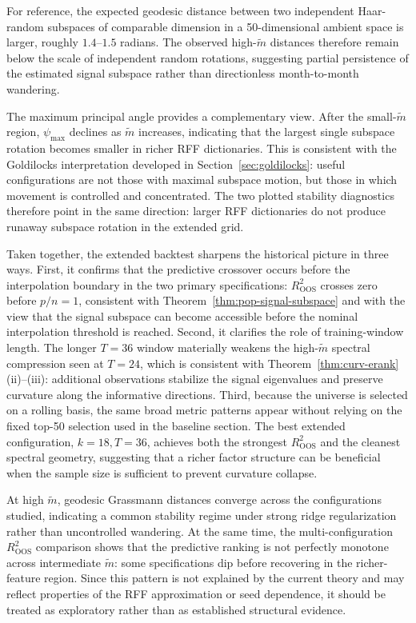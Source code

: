 \documentclass[11pt,letterpaper]{article}
\begin{document}
For reference, the expected geodesic distance between two independent
Haar-random subspaces of comparable dimension in a 50-dimensional ambient space
is larger, roughly $1.4$--$1.5$ radians. The observed high-$\tilde m$ distances
therefore remain below the scale of independent random rotations, suggesting
partial persistence of the estimated signal subspace rather than directionless
month-to-month wandering.

The maximum principal angle provides a complementary view. After the small-$\tilde m$
region, $\psi_{\max}$ declines as $\tilde m$ increases, indicating that the
largest single subspace rotation becomes smaller in richer RFF dictionaries.
This is consistent with the Goldilocks interpretation developed in
Section~\ref{sec:goldilocks}: useful configurations are not those with maximal
subspace motion, but those in which movement is controlled and concentrated.
The two plotted stability diagnostics therefore point in the same direction:
larger RFF dictionaries do not produce runaway subspace rotation in the extended
grid.

Taken together, the extended backtest sharpens the historical picture in three
ways. First, it confirms that the predictive crossover occurs before the
interpolation boundary in the two primary specifications:
$R^2_{\mathrm{OOS}}$ crosses zero before $p/n=1$, consistent with
Theorem~\ref{thm:pop-signal-subspace} and with the view that the signal
subspace can become accessible before the nominal interpolation threshold is
reached. Second, it clarifies the role of training-window length. The longer
$T=36$ window materially weakens the high-$\tilde m$ spectral compression seen
at $T=24$, which is consistent with
Theorem~\ref{thm:curv-erank}(ii)--(iii): additional observations stabilize the
signal eigenvalues and preserve curvature along the informative directions.
Third, because the universe is selected on a rolling basis, the same broad
metric patterns appear without relying on the fixed top-50 selection used in
the baseline section. The best extended configuration, $k=18, T=36$, achieves
both the strongest $R^2_{\mathrm{OOS}}$ and the cleanest spectral geometry,
suggesting that a richer factor structure can be beneficial when the sample
size is sufficient to prevent curvature collapse.

At high $\tilde m$, geodesic Grassmann distances converge across the
configurations studied, indicating a common stability regime under strong ridge
regularization rather than uncontrolled wandering. At the same time, the
multi-configuration $R^2_{\mathrm{OOS}}$ comparison shows that the predictive
ranking is not perfectly monotone across intermediate $\tilde m$: some
specifications dip before recovering in the richer-feature region. Since this
pattern is not explained by the current theory and may reflect properties of
the RFF approximation or seed dependence, it should be treated as exploratory
rather than as established structural evidence.
\end{document}
